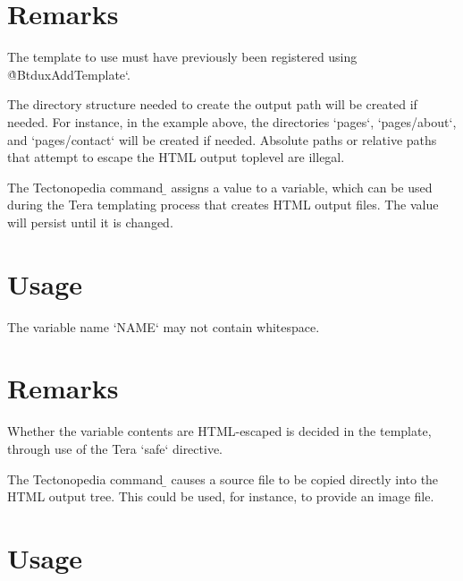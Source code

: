 \section*{Remarks}

The template to use must have previously been registered using
\`@BtduxAddTemplate`.

The directory structure needed to create the output path will be created if
needed. For instance, in the example above, the directories \tex`pages`,
\tex`pages/about`, and \tex`pages/contact` will be created if needed. Absolute
paths or relative paths that attempt to escape the HTML output toplevel are
illegal.

\tduxEmit



The Tectonopedia command \b{\string\tduxSetTemplateVariable} assigns a value to
a variable, which can be used during the Tera templating process that creates
HTML output files. The value will persist until it is changed.

\section*{Usage}

\begin{texdisp}
\end{texdisp}

The variable name \tex`NAME` may not contain whitespace.

\section*{Remarks}

Whether the variable contents are HTML-escaped is decided in the template,
through use of the Tera \tex`safe` directive.

\tduxEmit



The Tectonopedia command \b{\string\tduxProvideFile} causes a source file to be
copied directly into the HTML output tree. This could be used, for instance, to
provide an image file.

\section*{Usage}

